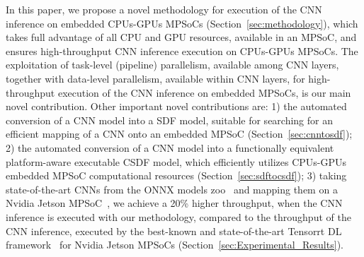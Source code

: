 In this paper, we propose a novel methodology for  execution of the CNN  inference on  embedded CPUs-GPUs MPSoCs (Section~\ref{sec:methodology}), which takes full advantage of all CPU and GPU resources, available in an MPSoC, and ensures high-throughput CNN inference execution on CPUs-GPUs MPSoCs. The exploitation of task-level (pipeline) parallelism, available among CNN layers, together with data-level parallelism, available within CNN layers, for high-throughput execution of the CNN inference on embedded MPSoCs, is our main novel contribution. Other important novel contributions are: 1) the automated conversion of a CNN model into a SDF model, suitable for searching for an efficient mapping of a CNN onto an  embedded MPSoC (Section~\ref{sec:cnntosdf}); 2) the automated conversion of a CNN model into a  functionally equivalent platform-aware executable CSDF model, which efficiently utilizes  CPUs-GPUs embedded MPSoC computational resources (Section~\ref{sec:sdftocsdf}); 3) taking state-of-the-art CNNs from the ONNX models zoo~\cite{ONNXmodelsZoo} and mapping them on a Nvidia Jetson MPSoC~\cite{JetsonTX2}, we achieve a 20\% higher throughput, when the CNN inference is executed with our methodology, compared to the throughput of the CNN inference, executed by the best-known and state-of-the-art Tensorrt DL framework~\cite{Tensorrt} for Nvidia Jetson MPSoCs (Section~\ref{sec:Experimental_Results}). 
 